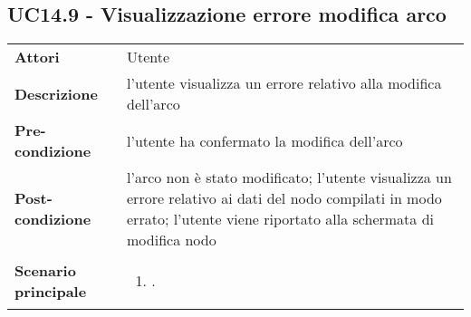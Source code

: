 \subsection{UC14.9 - Visualizzazione errore modifica arco} 
\label{sssec:UC14.9} 
\def\arraystretch{1.5}
\begin{tabularx}{\textwidth}{l|p{}}
	\rowcolor{I} \multicolumn{2}{c}{\color{white}\textbf{UC14.9 - Visualizzazione errore modifica arco}} \\
	\toprule
	\endhead
	\textbf{Attori} & Utente\\
	\textbf{Descrizione} & l'utente visualizza un errore relativo alla modifica dell'arco\\
	\textbf{Pre-condizione} & l'utente ha confermato la modifica dell'arco\\
	\textbf{Post-condizione} & l'arco non è stato modificato; l'utente visualizza un errore relativo ai dati del nodo compilati in modo errato; l'utente viene riportato alla schermata di modifica nodo\\
	\textbf{Scenario principale} & \vspace{-1.2em}\begin{enumerate}[leftmargin=*,noitemsep,nosep]
		\item \nameref{sssec:UC14.9}.
	\end{enumerate}\\
	\bottomrule
\end{tabularx}
